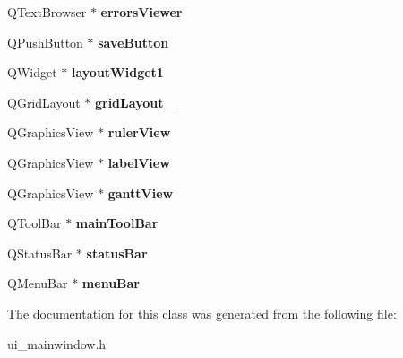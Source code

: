 \begin{DoxyCompactItemize}
\item 
\hypertarget{class_ui___main_window_a7d8c07c464bdd9ae616d88d5d85f5c13}{}Q\+Text\+Browser $\ast$ {\bfseries errors\+Viewer}\label{class_ui___main_window_a7d8c07c464bdd9ae616d88d5d85f5c13}

\item 
\hypertarget{class_ui___main_window_a7f6b63ce7ca36d553480fc0b20b15b0e}{}Q\+Push\+Button $\ast$ {\bfseries save\+Button}\label{class_ui___main_window_a7f6b63ce7ca36d553480fc0b20b15b0e}

\item 
\hypertarget{class_ui___main_window_aab31b3dec8d767525dea6f163e029e48}{}Q\+Widget $\ast$ {\bfseries layout\+Widget1}\label{class_ui___main_window_aab31b3dec8d767525dea6f163e029e48}

\item 
\hypertarget{class_ui___main_window_a6b2a0c5f7e8ff2a87134908dd770d2d2}{}Q\+Grid\+Layout $\ast$ {\bfseries grid\+Layout\+\_}\label{class_ui___main_window_a6b2a0c5f7e8ff2a87134908dd770d2d2}

\item 
\hypertarget{class_ui___main_window_a410197c6a086853ecb67b777a5d6eab1}{}Q\+Graphics\+View $\ast$ {\bfseries ruler\+View}\label{class_ui___main_window_a410197c6a086853ecb67b777a5d6eab1}

\item 
\hypertarget{class_ui___main_window_ad2d4f53301cf9cb6ecdb606e6bbbe9b2}{}Q\+Graphics\+View $\ast$ {\bfseries label\+View}\label{class_ui___main_window_ad2d4f53301cf9cb6ecdb606e6bbbe9b2}

\item 
\hypertarget{class_ui___main_window_a43a3a453d89302e0ba6101a82aacb1d0}{}Q\+Graphics\+View $\ast$ {\bfseries gantt\+View}\label{class_ui___main_window_a43a3a453d89302e0ba6101a82aacb1d0}

\item 
\hypertarget{class_ui___main_window_a5172877001c8c7b4e0f6de50421867d1}{}Q\+Tool\+Bar $\ast$ {\bfseries main\+Tool\+Bar}\label{class_ui___main_window_a5172877001c8c7b4e0f6de50421867d1}

\item 
\hypertarget{class_ui___main_window_a50fa481337604bcc8bf68de18ab16ecd}{}Q\+Status\+Bar $\ast$ {\bfseries status\+Bar}\label{class_ui___main_window_a50fa481337604bcc8bf68de18ab16ecd}

\item 
\hypertarget{class_ui___main_window_a2be1c24ec9adfca18e1dcc951931457f}{}Q\+Menu\+Bar $\ast$ {\bfseries menu\+Bar}\label{class_ui___main_window_a2be1c24ec9adfca18e1dcc951931457f}

\end{DoxyCompactItemize}


The documentation for this class was generated from the following file\+:\begin{DoxyCompactItemize}
\item 
ui\+\_\+mainwindow.\+h\end{DoxyCompactItemize}
